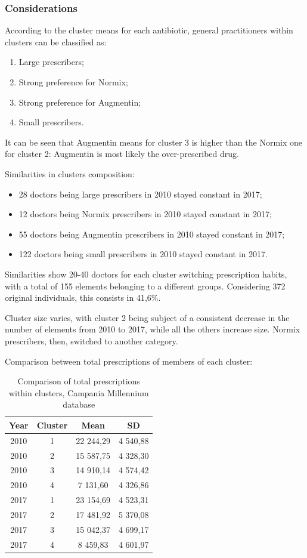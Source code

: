 \subsubsection{Considerations}
According to the cluster means for each antibiotic, general practitioners within clusters can be classified as:
\begin{enumerate}
	\item Large prescribers;
	\item Strong preference for Normix;
	\item Strong preference for Augmentin;
	\item Small prescribers.
\end{enumerate}

It can be seen that Augmentin means for cluster 3 is higher than the Normix one for cluster 2: Augmentin is most likely the over-prescribed drug.

Similarities in clusters composition:
\begin{itemize}
	\item 28 doctors being large prescribers in 2010 stayed constant in 2017;
	\item 12 doctors being Normix prescribers in 2010 stayed constant in 2017;
	\item 55 doctors being Augmentin prescribers in 2010 stayed constant in 2017;
	\item 122 doctors being small prescribers in 2010 stayed constant in 2017.
\end{itemize}

Similarities show 20-40 doctors for each cluster switching prescription habits, with a total of 155 elements belonging to a different groups. Considering 372 original individuals, this consists in 41,6\%.

Cluster size varies, with cluster 2 being subject of a consistent decrease in the number of elements from 2010 to 2017, while all the others increase size. Normix prescribers, then, switched to another category.

Comparison between total prescriptions of members of each cluster:
\begin{table}[h]
	\centering
	\begin{tabular}{c|c|c|c}
		Year & Cluster & Mean & SD \\
		\hline
		2010 & 1 & 22 244,29 & 4 540,88 \\
		\hline
		2010 & 2 & 15 587,75 & 4 328,30 \\
		\hline
		2010 & 3 & 14 910,14 & 4 574,42 \\
		\hline
		2010 & 4 & 7 131,60 & 4 326,86 \\
		\hline
		2017 & 1 & 23 154,69 & 4 523,31 \\
		\hline
		2017 & 2 & 17 481,92 & 5 370,08 \\
		\hline
		2017 & 3 & 15 042,37 &4 699,17 \\
		\hline
		2017 & 4 & 8 459,83 & 4 601,97 \\
	\end{tabular}
	\caption{\small Comparison of total prescriptions within clusters, Campania Millennium database}
\end{table}

